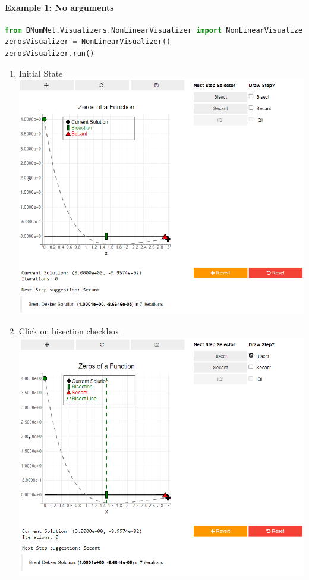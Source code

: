 \paragraph{Example 1: No arguments}
\begin{lstlisting}[language=Python]
from BNumMet.Visualizers.NonLinearVisualizer import NonLinearVisualizer
zerosVisualizer = NonLinearVisualizer()
zerosVisualizer.run()
\end{lstlisting}
\begin{enumerate}
    \item Initial State\\
    \includegraphics[scale=0.6]{Include/Images/Thesis/Documentation/Visualizers/NonLinear/Example 1/Example 1 - 00 - Initial State.png}
    \item Click on bisection checkbox\\
    \includegraphics[scale=0.6]{Include/Images/Thesis/Documentation/Visualizers/NonLinear/Example 1/Example 1 - 01 - Bisection Checkbox.png}

\end{enumerate}
